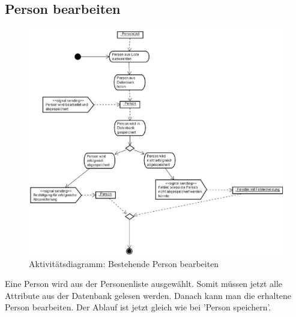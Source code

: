 \subsection{Person bearbeiten}
\begin{figure}[ht]
\begin{center}
\includegraphics[width=13cm]{images/personakt.png}
\caption{Aktivitätsdiagramm:  Bestehende Person bearbeiten}
\end{center}
\end{figure}
Eine Person wird aus der Personenliste ausgewählt. Somit müssen jetzt alle Attribute aus
der Datenbank gelesen werden. Danach kann man die erhaltene Person bearbeiten. Der
Ablauf ist jetzt gleich wie bei 'Person speichern'.
\clearpage
